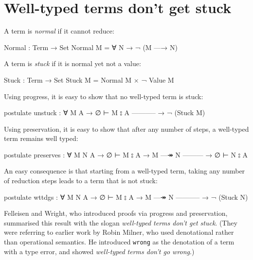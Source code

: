 \hypertarget{well-typed-terms-dont-get-stuck}{%
\section{Well-typed terms don't get
stuck}\label{well-typed-terms-dont-get-stuck}}

A term is \emph{normal} if it cannot reduce:

\begin{fence}
\begin{code}
Normal : Term → Set
Normal M  =  ∀ {N} → ¬ (M —→ N)
\end{code}
\end{fence}

A term is \emph{stuck} if it is normal yet not a value:

\begin{fence}
\begin{code}
Stuck : Term → Set
Stuck M  =  Normal M × ¬ Value M
\end{code}
\end{fence}

Using progress, it is easy to show that no well-typed term is stuck:

\begin{fence}
\begin{code}
postulate
  unstuck : ∀ {M A}
    → ∅ ⊢ M ⦂ A
      -----------
    → ¬ (Stuck M)
\end{code}
\end{fence}

Using preservation, it is easy to show that after any number of steps, a
well-typed term remains well typed:

\begin{fence}
\begin{code}
postulate
  preserves : ∀ {M N A}
    → ∅ ⊢ M ⦂ A
    → M —↠ N
      ---------
    → ∅ ⊢ N ⦂ A
\end{code}
\end{fence}

An easy consequence is that starting from a well-typed term, taking any
number of reduction steps leads to a term that is not stuck:

\begin{fence}
\begin{code}
postulate
  wttdgs : ∀ {M N A}
    → ∅ ⊢ M ⦂ A
    → M —↠ N
      -----------
    → ¬ (Stuck N)
\end{code}
\end{fence}

Felleisen and Wright, who introduced proofs via progress and
preservation, summarised this result with the slogan \emph{well-typed
terms don't get stuck}. (They were referring to earlier work by Robin
Milner, who used denotational rather than operational semantics. He
introduced \texttt{wrong} as the denotation of a term with a type error,
and showed \emph{well-typed terms don't go wrong}.)

